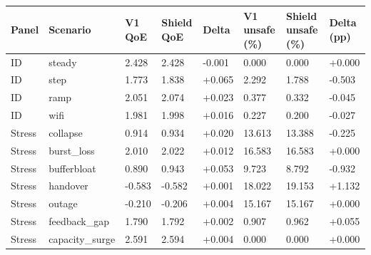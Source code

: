 \begin{tabular}{llllllll}
\toprule
Panel & Scenario & V1 QoE & Shield QoE & Delta & V1 unsafe (\%) & Shield unsafe (\%) & Delta (pp) \\
\midrule
ID & steady & 2.428 & 2.428 & -0.001 & 0.000 & 0.000 & +0.000 \\
ID & step & 1.773 & 1.838 & +0.065 & 2.292 & 1.788 & -0.503 \\
ID & ramp & 2.051 & 2.074 & +0.023 & 0.377 & 0.332 & -0.045 \\
ID & wifi & 1.981 & 1.998 & +0.016 & 0.227 & 0.200 & -0.027 \\
Stress & collapse & 0.914 & 0.934 & +0.020 & 13.613 & 13.388 & -0.225 \\
Stress & burst\_loss & 2.010 & 2.022 & +0.012 & 16.583 & 16.583 & +0.000 \\
Stress & bufferbloat & 0.890 & 0.943 & +0.053 & 9.723 & 8.792 & -0.932 \\
Stress & handover & -0.583 & -0.582 & +0.001 & 18.022 & 19.153 & +1.132 \\
Stress & outage & -0.210 & -0.206 & +0.004 & 15.167 & 15.167 & +0.000 \\
Stress & feedback\_gap & 1.790 & 1.792 & +0.002 & 0.907 & 0.962 & +0.055 \\
Stress & capacity\_surge & 2.591 & 2.594 & +0.004 & 0.000 & 0.000 & +0.000 \\
\bottomrule
\end{tabular}
